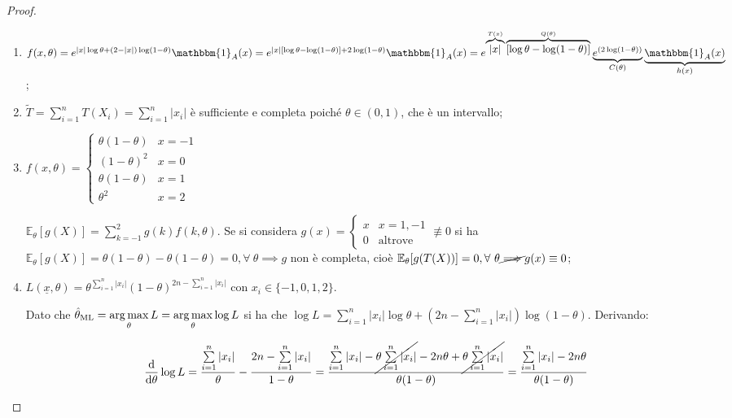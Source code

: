 \documentclass[hidelinks, 10pt]{report}
\DeclareMathOperator{\argmax}{\arg\max}
\begin{document}
\begin{proof}
\noindent
\begin{enumerate}
\item $ f(x, \theta) = e^{\vert x \vert \log \theta + (2 - \vert x \vert) \log (1 - \theta)} \mathbbm{1}_{A} (x) = e^{\vert x \vert [\log \theta - \log (1 - \theta)]  + 2 \log (1 - \theta)} \mathbbm{1}_{A} (x) = e^{\overbrace{\vert x \vert}^{T(x)} \overbrace{[\log \theta - \log (1 - \theta)]}^{Q(\theta)}} \underbrace{e^{\left( 2 \log (1 - \theta) \right)}}_{C(\theta)} \underbrace{\mathbbm{1}_{A} (x)}_{h(x)} $;
\item $ \tilde{T} = \sum\limits_{i = 1}^{n} T(X_i) = \sum\limits_{i = 1}^{n} \vert x_{i} \vert $ \`e sufficiente e completa poich\'e $ \theta \in (0, 1) $, che \`e un intervallo;
\item $ f(x, \theta) = \begin{cases} \theta(1 - \theta) & x = - 1 \\ (1 - \theta)^{2} & x = 0 \\ \theta (1 - \theta) & x = 1 \\ \theta^{2} & x = 2 \end{cases} $

$ \mathbb{E}_{\theta} [g(X)] = \sum\limits_{k = -1}^{2} g(k) f(k, \theta) $. Se si considera $ g(x) = \begin{cases} x & x = 1, -1 \\ 0 & \text{altrove} \end{cases} \not\equiv 0 $ si ha $ \mathbb{E}_{\theta} [g(X)] = \theta(1 - \theta) - \theta(1 - \theta) = 0, \forall\ \theta \implies g $ non \`e completa, cio\`e $ \mathbb{E}_{\theta} [g(T(X))] = 0, \forall\ \theta \cancel{\implies} g(x) \equiv 0 $;
\item $ L(\underline{x}, \theta) = \theta^{\sum\limits_{i = 1}^{n} \vert x_{i} \vert} (1 - \theta)^{2n - \sum\limits_{i = 1}^{n} \vert x_{i} \vert} $ con $ x_{i} \in \{ -1, 0, 1, 2 \} $.

Dato che $ \ML{\theta} = \argmax\limits_{\theta} L = \argmax\limits_{\theta} \log L $ si ha che $ \log L = \sum\limits_{i = 1}^{n} \vert x_{i} \vert \log \theta + (2n -\sum\limits_{i = 1}^{n} \vert x_{i} \vert) \log (1 - \theta) $. Derivando:

\[ \frac{\mathrm{d}}{\mathrm{d} \theta} \log L = \frac{\sum\limits_{i = 1}^{n} \vert x_{i} \vert}{\theta} - \frac{2n - \sum\limits_{i = 1}^{n} \vert x_{i} \vert}{1 - \theta} = \frac{\sum\limits_{i = 1}^{n} \vert x_{i} \vert - \cancel{\theta \sum\limits_{i = 1}^{n} \vert x_{i} \vert} - 2 n \theta + \cancel{\theta \sum\limits_{i = 1}^{n} \vert x_{i} \vert} }{\theta(1 - \theta)} = \frac{\sum\limits_{i = 1}^{n} \vert x_{i} \vert - 2 n \theta}{\theta (1 - \theta)} \]


\end{enumerate}
\end{proof}
\end{document}
